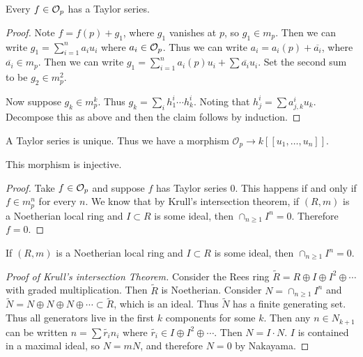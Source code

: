 \documentclass[twoside, 10pt]{article}
\begin{document}
    \begin{lem} Every $f \in \mathcal{O}_p$ has a Taylor series.  \begin{proof} Note
        $f = f(p) + g_1$, where $g_1$ vanishes at $p$, so $g_1 \in m_p$. Then
        we can write $g_1 = \sum_{i=1}^n a_iu_i$ where $a_i \in \mathcal{O}_p$. Thus
        we can write $a_i = a_i(p) + \overline{a_i}$, where $\overline{a_i} \in
        m_p$. Then we can write $g_1 = \sum_{i=1}^n a_i(p)u_i + \sum
        \overline{a_i} u_i$. Set the second sum to be $g_2 \in m_p^2$.

            Now suppose $g_k \in m_p^k$. Thus $g_k = \sum_i h_1^i \cdots
        h_k^i$. Noting that $h_j^i = \sum a_{j,k}^i u_k$. Decompose this as
    above and then the claim follows by induction.  \end{proof} \end{lem}

    \begin{lem} A Taylor series is unique. Thus we have a morphism
    $\mathcal{O}_p \to k[[u_1, \ldots, u_n]]$.  \end{lem}

    \begin{lem} This morphism is injective.  \begin{proof} Take $f \in
        \mathcal{O}_p$ and suppose $f$ has Taylor series $0$. This happens if and
        only if $f \in m_p^n$ for every $n$. We know that by Krull's
        intersection theorem, if $(R,m)$ is a Noetherian local ring and $I
    \subset R$ is some ideal, then $\cap_{n \geq 1} I^n = 0$.  Therefore $f =
0$.  \end{proof} \end{lem}

    \begin{thm} If $(R,m)$ is a Noetherian local
    ring and $I \subset R$ is some ideal, then $\cap_{n \geq 1} I^n = 0$.
\end{thm}

    \begin{proof}[Proof of Krull's intersection Theorem] Consider the Rees ring
        $\widetilde{R} = R \oplus I \oplus I^2 \oplus \cdots$ with graded
        multiplication. Then $\widetilde{R}$ is Noetherian.  Consider $N =
        \cap_{n\geq 1}I^n$ and $\widetilde{N} = N \oplus N \oplus N \oplus
        \cdots \subset \widetilde{R}$, which is an ideal. Thus $\widetilde{N}$
        has a finite generating set. Thus all generators live in the first $k$
        components for some $k$. Then any $n \in N_{k+1}$ can be written $n =
        \sum \widetilde{r_i} n_i$ where $\widetilde{r_i} \in I \oplus I^2
        \oplus \cdots$. Then $N = I \cdot N$. $I$ is contained in a maximal
        ideal, so $N = mN$, and therefore $N=0$ by Nakayama.  \end{proof}
\end{document}
